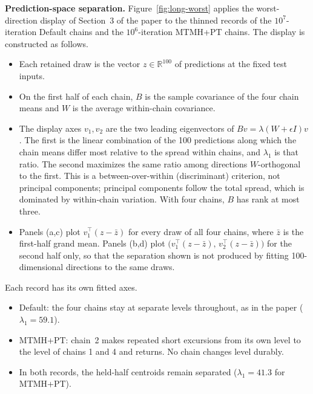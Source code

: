 \documentclass[11pt]{article}
\begin{document}
\textbf{Prediction-space separation.} Figure~\ref{fig:long-worst} applies the worst-direction display of Section~3 of the paper to the thinned records of the $10^7$-iteration Default chains and the $10^6$-iteration MTMH+PT chains. The display is constructed as follows.
\begin{itemize}
\item Each retained draw is the vector $z\in\mathbb R^{100}$ of predictions at the fixed test inputs.
\item On the first half of each chain, $B$ is the sample covariance of the four chain means and $W$ is the average within-chain covariance.
\item The display axes $v_1,v_2$ are the two leading eigenvectors of $Bv=\lambda(W+\epsilon I)v$. The first is the linear combination of the 100 predictions along which the chain means differ most relative to the spread within chains, and $\lambda_1$ is that ratio. The second maximizes the same ratio among directions $W$-orthogonal to the first. This is a between-over-within (discriminant) criterion, not principal components; principal components follow the total spread, which is dominated by within-chain variation. With four chains, $B$ has rank at most three.
\item Panels (a,c) plot $v_1^\top(z-\bar z)$ for every draw of all four chains, where $\bar z$ is the first-half grand mean. Panels (b,d) plot $\bigl(v_1^\top(z-\bar z),\,v_2^\top(z-\bar z)\bigr)$ for the second half only, so that the separation shown is not produced by fitting 100-dimensional directions to the same draws.
\end{itemize}
Each record has its own fitted axes.
\begin{itemize}
\item Default: the four chains stay at separate levels throughout, as in the paper ($\lambda_1=59.1$).
\item MTMH+PT: chain~2 makes repeated short excursions from its own level to the level of chains 1 and 4 and returns. No chain changes level durably.
\item In both records, the held-half centroids remain separated ($\lambda_1=41.3$ for MTMH+PT).
\end{itemize}
\end{document}
